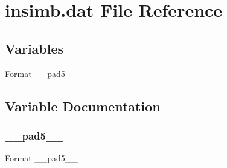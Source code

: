 \hypertarget{insimb_8dat}{}\section{insimb.\+dat File Reference}
\label{insimb_8dat}
\subsection*{Variables}
\begin{DoxyCompactItemize}
\item 
Format \hyperlink{insimb_8dat_a6e9b5f254f3801ccd3e2b5ec97cea875}{\+\_\+\+\_\+pad5\+\_\+\+\_\+}
\end{DoxyCompactItemize}


\subsection{Variable Documentation}
\mbox{\label{insimb_8dat_a6e9b5f254f3801ccd3e2b5ec97cea875}} 
\subsubsection{\texorpdfstring{\+\_\+\+\_\+pad5\+\_\+\+\_\+}{\_\_pad5\_\_}}
{\footnotesize\ttfamily Format \+\_\+\+\_\+pad5\+\_\+\+\_\+}

